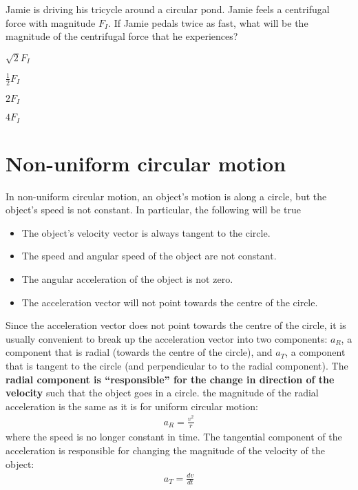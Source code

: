 \begin{checkpoint}
\begin{MCquestion}{Jamie is driving his tricycle around a circular pond. Jamie feels a centrifugal force with magnitude $F_I$. If Jamie pedals twice as fast, what will be the magnitude of the centrifugal force that he experiences?}
\item $\sqrt{2}F_I$
\item $\frac{1}{2}F_I$
\item $2F_I$
\item $4F_I$\correct
\end{MCquestion}
\end{checkpoint}

\section{Non-uniform circular motion}
In non-uniform circular motion, an object's motion is along a circle, but the object's speed is not constant. In particular, the following will be true
\begin{itemize}
\item The object's velocity vector is always tangent to the circle.
\item The speed and angular speed of the object are not constant.
\item The angular acceleration of the object is not zero.
\item The acceleration vector will not point towards the centre of the circle. 
\end{itemize}
Since the acceleration vector does not point towards the centre of the circle, it is usually convenient to break up the acceleration vector into two components: $a_R$, a component that is radial (towards the centre of the circle), and $a_T$, a component that is tangent to the circle (and perpendicular to to the radial component). The \textbf{radial component is ``responsible'' for the change in direction of the velocity} such that the object goes in a circle. the magnitude of the radial acceleration is the same as it is for uniform circular motion:
\begin{align*}
a_R=\frac{v^2}{r}
\end{align*}
where the speed is no longer constant in time. The tangential component of the acceleration is responsible for changing the magnitude of the velocity of the object:
\begin{align*}
a_T = \frac{dv}{dt}
\end{align*}


